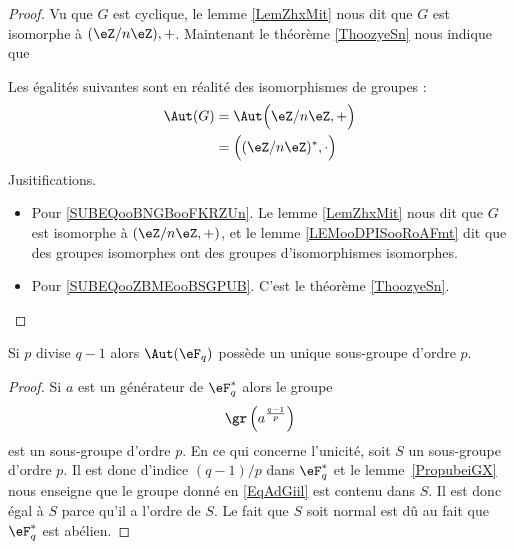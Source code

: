\begin{proof}
    Vu que \( G\) est cyclique, le lemme \ref{LemZhxMit} nous dit que \( G\) est isomorphe à \( (\eZ/n\eZ),+\). Maintenant le théorème \ref{ThoozyeSn} nous indique que

    Les égalités suivantes sont en réalité des isomorphismes de groupes :
    \begin{subequations}
        \begin{align}
            \Aut(G)&=\Aut\Big( \eZ/n\eZ,+ \Big)  \label{SUBEQooBNGBooFKRZUn}\\
            &=\Big( (\eZ/n\eZ)^*,\cdot \Big)    \label{SUBEQooZBMEooBSGPUB}
        \end{align}
    \end{subequations}
    Jusitifications.
    \begin{itemize}
        \item 
            Pour \eqref{SUBEQooBNGBooFKRZUn}. Le lemme \ref{LemZhxMit} nous dit que \( G\) est isomorphe à \( (\eZ/n\eZ, +)\), et le lemme \ref{LEMooDPISooRoAFmt} dit que des groupes isomorphes ont des groupes d'isomorphismes isomorphes.

        \item
            Pour \eqref{SUBEQooZBMEooBSGPUB}. C'est le théorème \ref{ThoozyeSn}.
    \end{itemize}
\end{proof}

\begin{corollary}       \label{CorwgmoTK}
	Si \( p\) divise \( q-1\) alors \( \Aut(\eF_q)\) possède un unique sous-groupe d'ordre \( p\).
\end{corollary}

\begin{proof}
	Si \( a\) est un générateur de \( \eF_q^*\) alors le groupe
	\begin{equation}    \label{EqAdGiil}
		\gr\left( a^{\frac{ q-1 }{ p }} \right)
	\end{equation}
	est un sous-groupe d'ordre \( p\). En ce qui concerne l'unicité, soit \( S\) un sous-groupe d'ordre \( p\). Il est donc d'indice \( (q-1)/p\) dans \( \eF_q^*\) et le lemme~\ref{PropubeiGX} nous enseigne que le groupe donné en \eqref{EqAdGiil} est contenu dans \( S\). Il est donc égal à \( S\) parce qu'il a l'ordre de \( S\). Le fait que \( S\) soit normal est dû au fait que \( \eF_q^*\) est abélien.
\end{proof}




